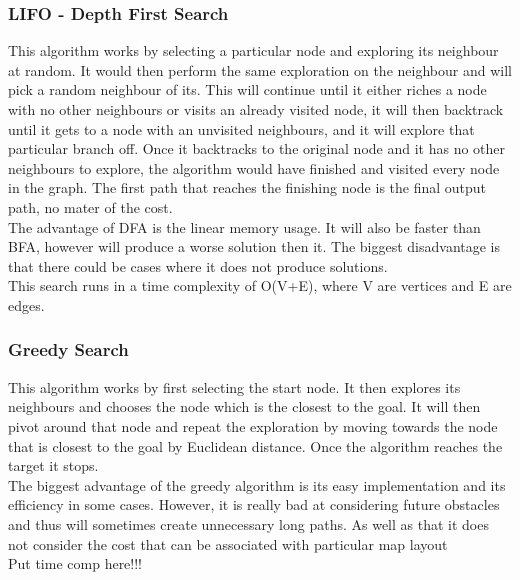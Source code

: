 \documentclass[a4paper,12pt]{article}
\begin{document}
			\subsubsection{LIFO - Depth First Search}
			
				This algorithm works by selecting a particular node and exploring its neighbour at random. It 
				would then perform the same exploration on the neighbour and will pick a random neighbour of its. 
				This will continue until it either riches a node with no other neighbours or visits an already 
				visited node, it will then backtrack until it gets to a node with an unvisited neighbours, and 
				it will explore that particular branch off. Once it backtracks to the original node and it has 
				no other neighbours to explore, the algorithm would have finished and visited every node in the 
				graph. The first path that reaches the finishing node is the final output path, no mater of the 
				cost. 
				\\
				The advantage of DFA is the linear memory usage. It will also be faster than BFA, however will
				produce a worse solution then it.  The biggest disadvantage is that there could be cases where 
				it does not produce solutions. 
				\\
				This search runs in a time complexity of O(V+E), where V are vertices and E are edges. 
			
			\subsubsection{Greedy Search}
				This algorithm works by first selecting the start node. It then explores its neighbours and
				chooses the node which is the closest to the goal. It will then pivot around that node and 
				repeat the exploration by moving towards the node that is closest to the goal by Euclidean 
				distance. Once the algorithm reaches the target it stops. 
				\\
				The biggest advantage of the greedy algorithm is its easy implementation and its efficiency
				in some cases. However, it is really bad at considering future obstacles and thus will sometimes
				create unnecessary long paths. As well as that it does not consider the cost that can be associated
				with particular map layout 
				\\
				Put time comp here!!!
\end{document}
